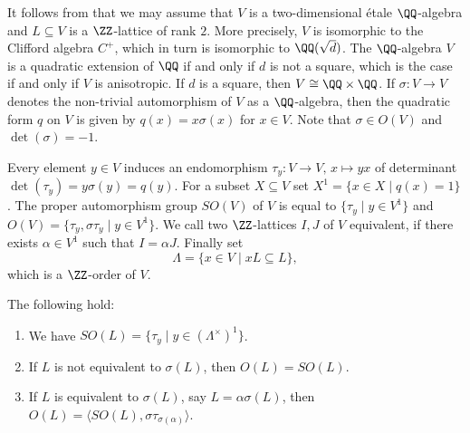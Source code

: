 It follows from \cite[\S 5]{Eichler1974} that we may assume that $V$ is a two-dimensional étale $\QQ$-algebra and $L \subseteq V$ is a $\ZZ$-lattice of rank $2$.
More precisely, $V$ is isomorphic to the Clifford algebra $C^+$, which in turn is isomorphic to $\QQ(\sqrt{d})$. The $\QQ$-algebra $V$ is a quadratic extension of $\QQ$ if and only if $d$ is not a square, which is the case if and only if $V$ is anisotropic. If $d$ is a square, then $V \cong \QQ \times \QQ$.
If $\sigma \colon V \to V$ denotes the non-trivial automorphism of $V$ as a $\QQ$-algebra,
then the quadratic form $q$ on $V$ is given by $q(x) = x \sigma(x)$ for $x \in V$.
Note that $\sigma \in O(V)$ and $\det(\sigma) = -1$.

Every element $y \in V$ induces an endomorphism $\tau_y \colon V \to V, \, x \mapsto yx$ of determinant $\det(\tau_y) = y \sigma(y) = q(y)$.
For a subset $X \subseteq V$ set $X^1 = \{ x \in X \mid q(x) = 1 \}$.
The proper automorphism group $SO(V)$ of $V$ is equal to $\{ \tau_y \mid y \in V^1\}$
and $O(V) = \{ \tau_y, \sigma \tau_y \mid y \in V^1 \}$.
We call two $\ZZ$-lattices $I, J$ of $V$ equivalent, if there exists $\alpha \in V^1$ such that $I = \alpha J$.
Finally set
\[
  \Lambda = \{ x \in V \mid xL \subseteq L \},
\]
which is a $\ZZ$-order of $V$.

\begin{proposition}
  The following hold:
  \begin{enumerate}
    \item
      We have $SO(L) = \{ \tau_y \mid y \in (\Lambda^\times)^1 \}$.
    \item
      If $L$ is not equivalent to $\sigma(L)$, then $O(L) = SO(L)$.
    \item
      If $L$ is equivalent to $\sigma(L)$, say $L = \alpha \sigma(L)$, then
      $O(L) = \langle SO(L), \sigma \tau_{\sigma(\alpha)} \rangle$.
  \end{enumerate}
\end{proposition}


